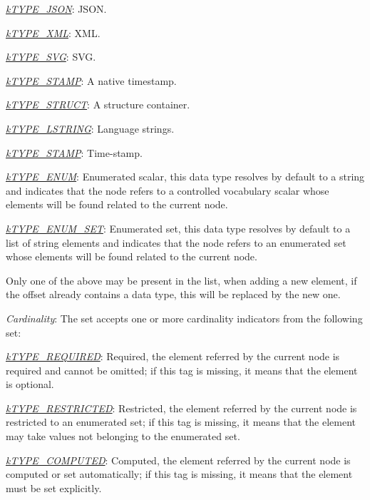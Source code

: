 \begin{DoxyItemize}
\begin{DoxyItemize}
\item {\itshape \hyperlink{}{k\-T\-Y\-P\-E\-\_\-\-J\-S\-O\-N}}\-: J\-S\-O\-N. 
\item {\itshape \hyperlink{}{k\-T\-Y\-P\-E\-\_\-\-X\-M\-L}}\-: X\-M\-L. 
\item {\itshape \hyperlink{}{k\-T\-Y\-P\-E\-\_\-\-S\-V\-G}}\-: S\-V\-G. 
\item {\itshape \hyperlink{}{k\-T\-Y\-P\-E\-\_\-\-S\-T\-A\-M\-P}}\-: A native timestamp. 
\item {\itshape \hyperlink{}{k\-T\-Y\-P\-E\-\_\-\-S\-T\-R\-U\-C\-T}}\-: A structure container. 
\item {\itshape \hyperlink{}{k\-T\-Y\-P\-E\-\_\-\-L\-S\-T\-R\-I\-N\-G}}\-: Language strings. 
\item {\itshape \hyperlink{}{k\-T\-Y\-P\-E\-\_\-\-S\-T\-A\-M\-P}}\-: Time-\/stamp. 
\item {\itshape \hyperlink{}{k\-T\-Y\-P\-E\-\_\-\-E\-N\-U\-M}}\-: Enumerated scalar, this data type resolves by default to a string and indicates that the node refers to a controlled vocabulary scalar whose elements will be found related to the current node. 
\item {\itshape \hyperlink{}{k\-T\-Y\-P\-E\-\_\-\-E\-N\-U\-M\-\_\-\-S\-E\-T}}\-: Enumerated set, this data type resolves by default to a list of string elements and indicates that the node refers to an enumerated set whose elements will be found related to the current node. 
\end{DoxyItemize}Only one of the above may be present in the list, when adding a new element, if the offset already contains a data type, this will be replaced by the new one. 
\item {\itshape Cardinality}\-: The set accepts one or more cardinality indicators from the following set\-: 
\begin{DoxyItemize}
\item {\itshape \hyperlink{}{k\-T\-Y\-P\-E\-\_\-\-R\-E\-Q\-U\-I\-R\-E\-D}}\-: Required, the element referred by the current node is required and cannot be omitted; if this tag is missing, it means that the element is optional. 
\item {\itshape \hyperlink{}{k\-T\-Y\-P\-E\-\_\-\-R\-E\-S\-T\-R\-I\-C\-T\-E\-D}}\-: Restricted, the element referred by the current node is restricted to an enumerated set; if this tag is missing, it means that the element may take values not belonging to the enumerated set. 
\item {\itshape \hyperlink{}{k\-T\-Y\-P\-E\-\_\-\-C\-O\-M\-P\-U\-T\-E\-D}}\-: Computed, the element referred by the current node is computed or set automatically; if this tag is missing, it means that the element must be set explicitly. 

\end{DoxyItemize}
\end{DoxyItemize}
